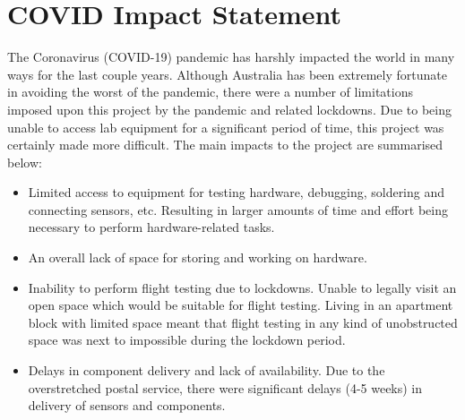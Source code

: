 

\chapter*{COVID Impact Statement}\label{COVIDStatement}

The Coronavirus (COVID-19) pandemic has harshly impacted the world in many ways for the last couple years. Although Australia has been extremely fortunate in avoiding the worst of the pandemic, there were a number of limitations imposed upon this project by the pandemic and related lockdowns. Due to being unable to access lab equipment for a significant period of time, this project was certainly made more difficult. The main impacts to the project are summarised below:
\begin{itemize}
  \item Limited access to equipment for testing hardware, debugging, soldering and connecting sensors, etc. Resulting in larger amounts of time and effort being necessary to perform hardware-related tasks.
  \item An overall lack of space for storing and working on hardware.
  \item Inability to perform flight testing due to lockdowns. Unable to legally visit an open space which would be suitable for flight testing. Living in an apartment block with limited space meant that flight testing in any kind of unobstructed space was next to impossible during the lockdown period.
	\item Delays in component delivery and lack of availability. Due to the overstretched postal service,  there were significant delays (4-5 weeks) in delivery of sensors and components.
\end{itemize}

\clearpage



